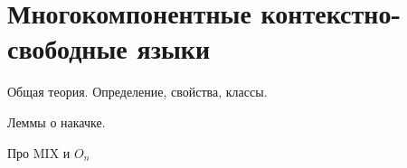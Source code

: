\chapter{Многокомпонентные контекстно-свободные языки}

Общая теория. Определение, свойства, классы.

Леммы о накачке.

Про MIX и $O_n$

